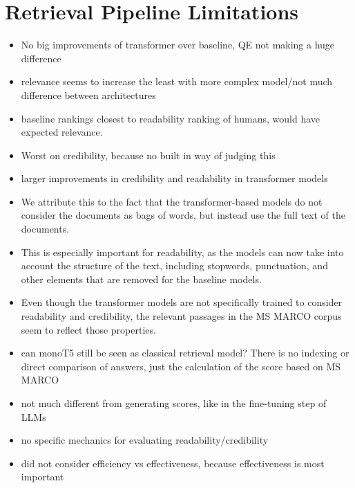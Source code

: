 \section{Retrieval Pipeline Limitations}
\begin{itemize}
    \item No big improvements of transformer over baseline, QE not making a huge difference
    \item relevance seems to increase the least with more complex model/not much difference between architectures
    \item baseline rankings closest to readability ranking of humans, would have expected relevance.
    \item Worst on credibility, because no built in way of judging this
    \item larger improvements in credibility and readability in transformer models
    \item We attribute this to the fact that the transformer-based models do not consider the documents as bags of words, but instead use the full text of the documents.
    \item This is especially important for readability, as the models can now take into account the structure of the text, including stopwords, punctuation, and other elements that are removed for the baseline models.
    \item Even though the transformer models are not specifically trained to consider readability and credibility, the relevant passages in the MS MARCO corpus seem to reflect those properties.
    \item can monoT5 still be seen as classical retrieval model? There is no indexing or direct comparison of answers, just the calculation of the score based on MS MARCO
    \item not much different from generating scores, like in the fine-tuning step of LLMs
    \item no specific mechanics for evaluating readability/credibility
    \item did not consider efficiency vs effectiveness, because effectiveness is most important
\end{itemize}


